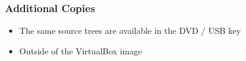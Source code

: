 
\begin{frame}
\frametitle{Additional Copies}
\begin{itemize}
\item The same source trees are available in the DVD / USB key
\item Outside of the VirtualBox image
\end{itemize}
\end{frame}



